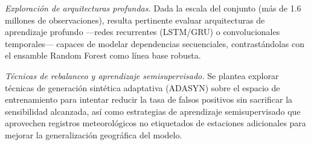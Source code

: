 \emph{Exploración de arquitecturas profundas.} Dada la escala del conjunto (más de
1.6 millones de observaciones), resulta pertinente evaluar arquitecturas de
aprendizaje profundo ---redes recurrentes (LSTM/GRU) o convolucionales
temporales--- capaces de modelar dependencias secuenciales, contrastándolas con el
ensamble Random Forest como línea base robusta.

\emph{Técnicas de rebalanceo y aprendizaje semisupervisado.} Se plantea explorar
técnicas de generación sintética adaptativa (ADASYN) sobre el espacio de
entrenamiento para intentar reducir la tasa de falsos positivos sin sacrificar la
sensibilidad alcanzada, así como estrategias de aprendizaje semisupervisado que
aprovechen registros meteorológicos no etiquetados de estaciones adicionales para
mejorar la generalización geográfica del modelo.